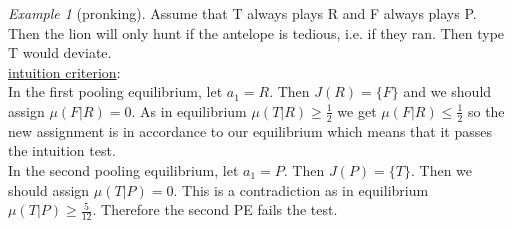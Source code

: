 \documentclass[a4paper, 12pt]{article}
\theoremstyle{plain}
\theoremstyle{definition}
\theoremstyle{lemma}
\theoremstyle{remark}
\theoremstyle{corollary}
\theoremstyle{example}
\newtheorem{example}[theorem]{Example}
\begin{document}
\begin{example}[pronking]
	Assume that T always plays R and F always plays P. Then the lion will only hunt if the antelope is tedious, i.e. if they ran. Then type T would deviate.\\
	\underline{intuition criterion}:\\
	In the first pooling equilibrium, let $a_1 = R$. Then $J(R) = \{F\}$ and we should assign $\mu(F|R)=0$. As in equilibrium $\mu(T|R) \geq \frac{1}{2}$ we get $\mu(F|R)\leq \frac{1}{2}$ so the new assignment is in accordance to our equilibrium which means that it passes the intuition test.\\
	In the second pooling equilibrium, let $a_1 = P$. Then $J(P) = \{T\}$. Then we should assign $\mu(T|P) = 0$. This is a contradiction as in equilibrium $\mu(T|P) \geq \frac{5}{12}$. Therefore the second PE fails the test.
	\end{example}
\end{document}
